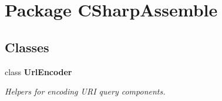 \hypertarget{namespace_c_sharp_assemble}{\section{Package C\+Sharp\+Assemble}
\label{namespace_c_sharp_assemble}
}
\subsection*{Classes}
\begin{DoxyCompactItemize}
\item 
class {\bfseries Url\+Encoder}
\begin{DoxyCompactList}\small\item\em Helpers for encoding U\+R\+I query components. \end{DoxyCompactList}\end{DoxyCompactItemize}
